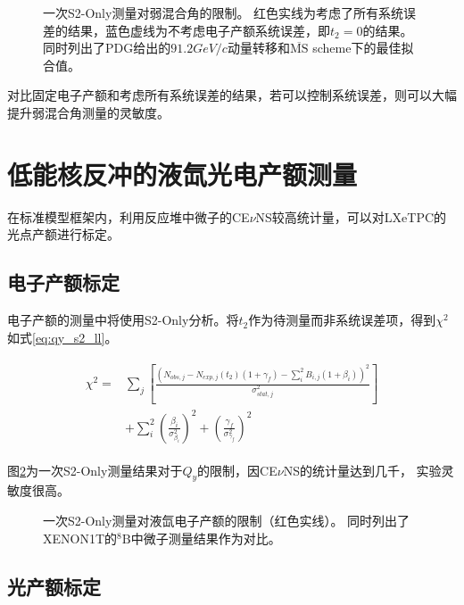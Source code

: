 \begin{figure}
  \centering
  
  \caption{\label{fig:thetaw_sensitivity_s2only} 一次S2-Only测量对弱混合角的限制。
  红色实线为考虑了所有系统误差的结果，蓝色虚线为不考虑电子产额系统误差，即$t_2=0$的结果。
  同时列出了PDG给出的$91.2\si{GeV/c}$动量转移和$\overline{\mathrm{MS}}$ scheme下的最佳拟合值\cite{particle_data_group_review_2020}。}
\end{figure}

对比固定电子产额和考虑所有系统误差的结果，若可以控制系统误差，则可以大幅提升弱混合角测量的灵敏度。

\section{低能核反冲的液氙光电产额测量}

在标准模型框架内，利用反应堆中微子的CE$\nu$NS较高统计量，可以对LXeTPC的光点产额进行标定。

\subsection{电子产额标定}

电子产额的测量中将使用S2-Only分析。将$t_2$作为待测量而非系统误差项，得到$\chi^2$如式\ref{eq:qy_s2_ll}。

\begin{align}
    \label{eq:qy_s2_ll}
    \begin{split}
    \chi^2 =& \sum_j\left[\frac{\left(N_{obs,j} - N_{exp,j}(t_2)(1 + \gamma_f) 
    - \sum_{i}^2 B_{i,j}(1 + \beta_i)\right)^2}{\sigma^2_{stat,j}}\right] \\
    & + \sum_{i}^2(\frac{\beta_i}{\sigma^2_{\beta_i}})^2 + (\frac{\gamma_f}{\sigma^2_{\gamma_f}})^2
    \end{split}
\end{align}

图\ref{fig:qy_sensitivity_s2only}为一次S2-Only测量结果对于$Q_y$的限制，因CE$\nu$NS的统计量达到几千，
实验灵敏度很高。

\begin{figure}
  \centering
  
  \caption{\label{fig:qy_sensitivity_s2only} 一次S2-Only测量对液氙电子产额的限制（红色实线）。
  同时列出了XENON1T的${}^{8}\mathrm{B}$中微子测量结果作为对比\cite{aprile_search_2021}。}
\end{figure}

\subsection{光产额标定}

